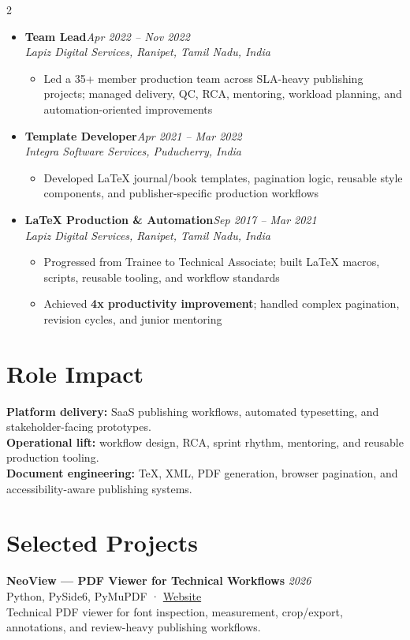 \documentclass[10pt]{article}
\newcommand{\role}[2]{%
  \item {\fontsize{11.4pt}{13pt}\selectfont\textbf{#1}}\hfill\textit{#2}\\[-1pt]
}
\begin{document}
\begin{paracol}{2}
\begin{itemize}[leftmargin=*, label={\textbullet}]
\role{Team Lead}{Apr 2022 -- Nov 2022}
\textit{Lapiz Digital Services, Ranipet, Tamil Nadu, India}
\begin{itemize}
  \item Led a 35+ member production team across SLA-heavy publishing projects; managed delivery, QC, RCA, mentoring, workload planning, and automation-oriented improvements
\end{itemize}

\role{Template Developer}{Apr 2021 -- Mar 2022}
\textit{Integra Software Services, Puducherry, India}
\begin{itemize}
  \item Developed LaTeX journal/book templates, pagination logic, reusable style components, and publisher-specific production workflows
\end{itemize}

\role{LaTeX Production \& Automation}{Sep 2017 -- Mar 2021}
\textit{Lapiz Digital Services, Ranipet, Tamil Nadu, India}
\begin{itemize}
  \item Progressed from Trainee to Technical Associate; built LaTeX macros, scripts, reusable tooling, and workflow standards
  \item Achieved \textbf{4x productivity improvement}; handled complex pagination, revision cycles, and junior mentoring
\end{itemize}

\end{itemize}

\section*{Role Impact}
\textbf{Platform delivery:} SaaS publishing workflows, automated typesetting, and stakeholder-facing prototypes.\\
\textbf{Operational lift:} workflow design, RCA, sprint rhythm, mentoring, and reusable production tooling.\\
\textbf{Document engineering:} TeX, XML, PDF generation, browser pagination, and accessibility-aware publishing systems.

\end{paracol}

\newpage
\section*{Selected Projects}
\textbf{NeoView — PDF Viewer for Technical Workflows} \hfill \textit{2026}\\
Python, PySide6, PyMuPDF · \href{https://srikanth-mohankumar.github.io/neoview/}{Website}\\
Technical PDF viewer for font inspection, measurement, crop/export, annotations, and review-heavy publishing workflows.
\end{document}
